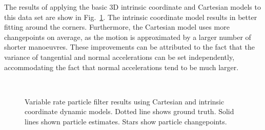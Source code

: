 \documentclass[conference]{IEEEtran}
\begin{document}
The results of applying the basic 3D intrinsic coordinate and Cartesian models to this data set are show in Fig.~\ref{fig:3D_CartesianIntrinsic}. The intrinsic coordinate model results in better fitting around the corners. Furthermore, the Cartesian model uses more changepoints on average, as the motion is approximated by a larger number of shorter manoeuvres. These improvements can be attributed to the fact that the variance of tangential and normal accelerations can be set independently, accommodating the fact that normal accelerations tend to be much larger.
%
\begin{figure}
\centering
{}
\\
\caption{Variable rate particle filter results using Cartesian and intrinsic coordinate dynamic models. Dotted line shows ground truth. Solid lines shown particle estimates. Stars show particle changepoints.}
\label{fig:3D_CartesianIntrinsic}
\end{figure}
\end{document}
